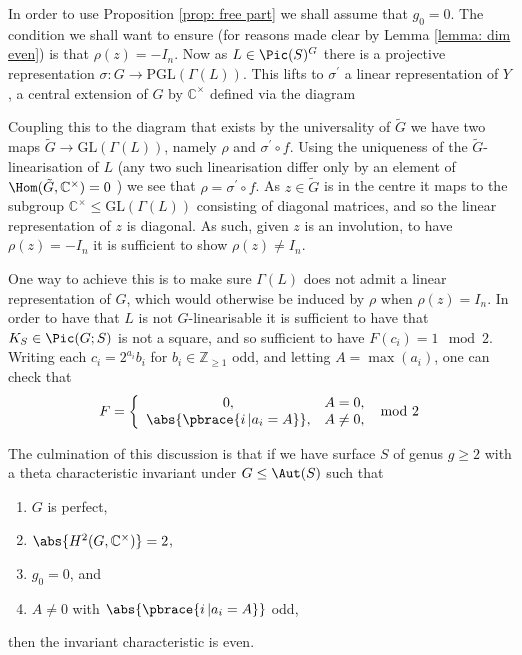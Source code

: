 \documentclass{amsart}
\begin{document}
In order to use Proposition \ref{prop: free part} we shall assume that $g_0=0$. The condition we shall want to ensure (for reasons made clear by Lemma \ref{lemma: dim even}) is that $\rho(z) = -I_n$. Now as $L \in \Pic(S)^G$ there is a projective representation $\sigma : G \to \mathrm{PGL}(\Gamma(L))$. This lifts to $\sigma^\prime$ a linear representation of $Y$, a central extension of $G$ by $\mathbb{C}^\times$ defined via the diagram \cite{Weibel1995}
\begin{center}
\end{center}
Coupling this to the diagram that exists by the universality of $\tilde{G}$ we have two maps $\tilde{G} \to \mathrm{GL}(\Gamma(L))$, namely $\rho$ and $\sigma^\prime \circ f$. Using the uniqueness of the $\tilde{G}$-linearisation of $L$ (any two such linearisation differ only by an element of $\Hom(\tilde{G}, \mathbb{C}^\times)=0$ \cite{Dolgachev1997a}) we see that $\rho = \sigma^\prime \circ f$. As $z \in \tilde{G}$ is in the centre it maps to the subgroup $\mathbb{C}^\times \leq \mathrm{GL}(\Gamma(L))$ consisting of diagonal matrices, and so the linear representation of $z$ is diagonal. As such, given $z$ is an involution, to have $\rho(z)=-I_n$ it is sufficient to show $\rho(z) \neq I_n$. 

One way to achieve this is to make sure $\Gamma(L)$ does not admit a linear representation of $G$, which would otherwise be induced by $\rho$ when $\rho(z)=I_n$. In order to have that $L$ is not $G$-linearisable it is sufficient to have that $K_S \in \Pic(G; S)$ is not a square, and so sufficient to have $F(c_i) = 1 \mod 2$. Writing each $c_i = 2^{a_i} b_i$ for $b_i \in \mathbb{Z}_{\geq 1}$ odd, and letting $A = \max(a_i)$, one can check that
\[
F = \left \lbrace \begin{array}{cc}
    0, & A=0, \\
    \abs{\pbrace{i \, | a_i=A}}, & A \neq 0,
\end{array} \mod 2 \right. 
\]



The culmination of this discussion is that if we have surface $S$ of genus $g\geq2$ with a theta characteristic invariant under $G \leq \Aut(S)$ such that 
\begin{enumerate}
    \item $G$ is perfect,
    \item $\abs{H^2(G, \mathbb{C}^\times)}=2$, 
    \item $g_0=0$, and 
    \item\label{item: parity} $A \neq 0$ with $\abs{\pbrace{i \, | a_i=A}}$ odd,
\end{enumerate}
then the invariant characteristic is even.
\end{document}
